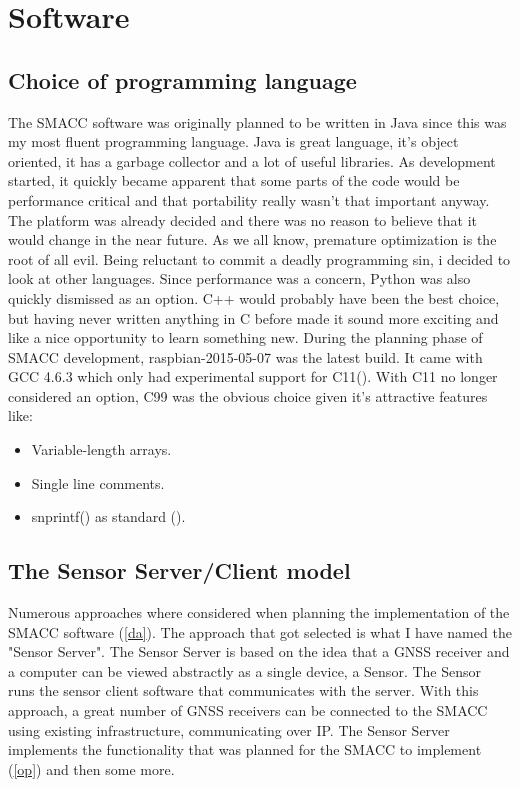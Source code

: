 \documentclass[12pt,english,a4paper]{report}
\begin{document}
\chapter{Software}
\section{Choice of programming language}
The SMACC software was originally planned to be written in Java since this was my most fluent programming language. Java is great language, it's object oriented, it has a garbage collector and a lot of useful libraries. As development started, it quickly became apparent that some parts of the code would be performance critical and that portability really wasn't that important anyway. The platform was already decided and there was no reason to believe that it would change in the near future. As we all know, premature optimization is the root of all evil. Being reluctant to commit a deadly programming sin, i decided to look at other languages. Since performance was a concern, Python was also quickly dismissed as an option. C++ would probably have been the best choice, but having never written anything in C before made it sound more exciting and like a nice opportunity to learn something new. During the planning phase of SMACC development, raspbian-2015-05-07 was the latest build. It came with GCC 4.6.3 which only had experimental support for C11(\cite{GCC11}). With C11 no longer considered an option, C99 was the obvious choice given it's attractive features like:
\begin{itemize}
  \item Variable-length arrays.
  \item Single line comments.
  \item snprintf() as standard (\cite{C_RATIONAL}).
\end{itemize}

\section{The Sensor Server/Client model}
Numerous approaches where considered when planning the implementation of the SMACC software (\ref{da}). The approach that got selected is what I have named the "Sensor Server". The Sensor Server is based on the idea that a GNSS receiver and a computer can be viewed abstractly as a single device, a Sensor. The Sensor runs the sensor client software that communicates with the server. With this approach, a great number of GNSS receivers can be connected to the SMACC using existing infrastructure, communicating over IP. The Sensor Server implements the functionality that was planned for the SMACC to implement (\ref{op}) and then some more.
\end{document}
